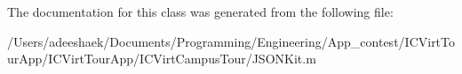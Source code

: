 The documentation for this class was generated from the following file\-:\begin{DoxyCompactItemize}
\item 
/\-Users/adeeshaek/\-Documents/\-Programming/\-Engineering/\-App\-\_\-contest/\-I\-C\-Virt\-Tour\-App/\-I\-C\-Virt\-Tour\-App/\-I\-C\-Virt\-Campus\-Tour/J\-S\-O\-N\-Kit.\-m\end{DoxyCompactItemize}
